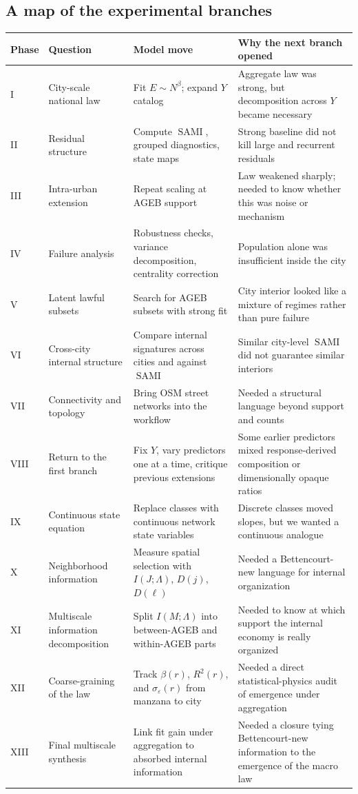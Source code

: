 \documentclass[11pt]{article}
\newcommand{\SAMI}{\operatorname{SAMI}}
\begin{document}
\subsection{A map of the experimental branches}

\begin{longtable}{p{}p{}p{}p{}}
\toprule
\textbf{Phase} & \textbf{Question} & \textbf{Model move} & \textbf{Why the next branch opened} \\
\midrule
\endhead
I & City-scale national law & Fit \(E \sim N^\beta\); expand \(Y\) catalog & Aggregate law was strong, but decomposition across \(Y\) became necessary \\
II & Residual structure & Compute \(\SAMI\), grouped diagnostics, state maps & Strong baseline did not kill large and recurrent residuals \\
III & Intra-urban extension & Repeat scaling at AGEB support & Law weakened sharply; needed to know whether this was noise or mechanism \\
IV & Failure analysis & Robustness checks, variance decomposition, centrality correction & Population alone was insufficient inside the city \\
V & Latent lawful subsets & Search for AGEB subsets with strong fit & City interior looked like a mixture of regimes rather than pure failure \\
VI & Cross-city internal structure & Compare internal signatures across cities and against \(\SAMI\) & Similar city-level \(\SAMI\) did not guarantee similar interiors \\
VII & Connectivity and topology & Bring OSM street networks into the workflow & Needed a structural language beyond support and counts \\
VIII & Return to the first branch & Fix \(Y\), vary predictors one at a time, critique previous extensions & Some earlier predictors mixed response-derived composition or dimensionally opaque ratios \\
IX & Continuous state equation & Replace classes with continuous network state variables & Discrete classes moved slopes, but we wanted a continuous analogue \\
X & Neighborhood information & Measure spatial selection with \(I(J;\Lambda)\), \(D(j)\), \(D(\ell)\) & Needed a Bettencourt-new language for internal organization \\
XI & Multiscale information decomposition & Split \(I(M;\Lambda)\) into between-AGEB and within-AGEB parts & Needed to know at which support the internal economy is really organized \\
XII & Coarse-graining of the law & Track \(\beta(r)\), \(R^2(r)\), and \(\sigma_\varepsilon(r)\) from manzana to city & Needed a direct statistical-physics audit of emergence under aggregation \\
XIII & Final multiscale synthesis & Link fit gain under aggregation to absorbed internal information & Needed a closure tying Bettencourt-new information to the emergence of the macro law \\
\bottomrule
\end{longtable}
\end{document}
